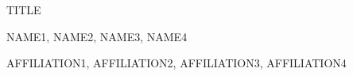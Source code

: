 \documentclass{article}
\begin{document}
\centering
\sffamily\bfseries
\setlength\parindent{0pt}
{\color{darkblue}

\thispagestyle{empty}

\Large

TITLE

\large

NAME1,
NAME2,
NAME3,
NAME4

\normalsize

{\rmfamily\itshape\bfseries

AFFILIATION1,
AFFILIATION2,
AFFILIATION3,
AFFILIATION4

}

}
\end{document}
